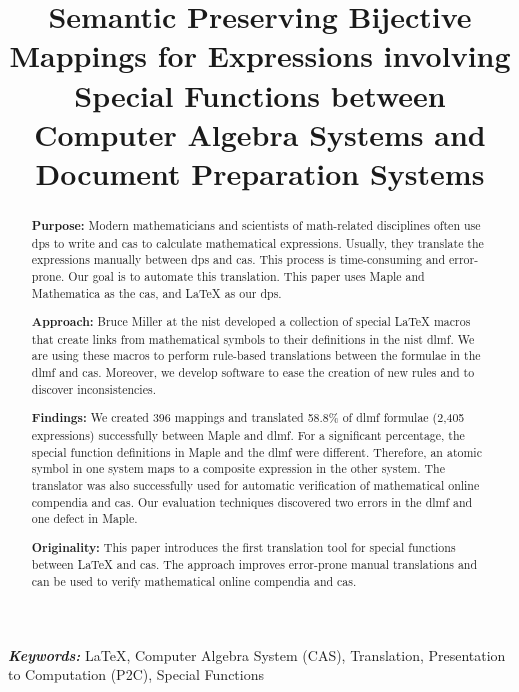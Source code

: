 \documentclass[a4paper,11pt]{article}
\title{
    Semantic Preserving Bijective Mappings for Expressions involving Special Functions between Computer Algebra Systems and Document Preparation Systems
}
\date{}
\newcommand{\Maple}{Maple}
\newcommand{\Mathematica}{Mathematica}
\theoremstyle{defTheoStyle}
\theoremstyle{defExampStyle}
\begin{document}
\maketitle
\begin{abstract}
\glsresetall
\noindent
\textbf{Purpose:} Modern mathematicians and scientists of math-related disciplines often use \gls*{dps} to write and \gls*{cas} to calculate mathematical expressions. Usually, they translate the expressions manually between \gls*{dps} and \gls*{cas}. This process is time-consuming and error-prone. Our goal is to automate this translation. This paper uses \Maple{} and \Mathematica{} as the \gls*{cas}, and \LaTeX{} as our \gls*{dps}.
 
\noindent\textbf{Approach:} Bruce Miller at the \gls*{nist} developed a collection of special \LaTeX{} macros that create links from mathematical symbols to their definitions in the \gls*{nist} \gls*{dlmf}. We are using these macros to perform rule-based translations between the formulae in the \gls*{dlmf} and \gls*{cas}. Moreover, we develop software to ease the creation of new rules and to discover inconsistencies.
 
\noindent\textbf{Findings:} We created 396 mappings and translated 58.8\% of \gls*{dlmf} formulae (2,405 expressions) successfully between \Maple{} and \gls*{dlmf}. For a significant percentage, the special function definitions in \Maple{} and the \gls*{dlmf} were different. Therefore, an atomic symbol in one system maps to a composite expression in the other system. The translator was also successfully used for automatic verification of mathematical online compendia and \gls*{cas}. Our evaluation techniques discovered two errors in the \gls*{dlmf} and one defect in \Maple.
 
\noindent\textbf{Originality:} This paper introduces the first translation tool for special functions between \LaTeX{} and \gls*{cas}. The approach improves error-prone manual translations and can be used to verify mathematical online compendia and \gls*{cas}.
\end{abstract} \glsresetall

\noindent
{\it \bf Keywords:} \LaTeX, Computer Algebra System (CAS), Translation, Presentation to Computation (P2C), Special Functions
\end{document}
